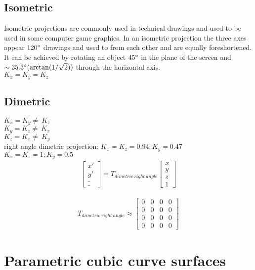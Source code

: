 \documentclass{article}
\begin{document}
\clearpage
\subsection{Isometric}
Isometric projections are commonly used in technical drawings and used to be used in some computer game graphics.
In an isometric projection the three axes appear $120\degree$ drawings and used to from each other and are equally foreshortened.
It can be achieved by rotating an object $45 \degree$ in the plane of the screen and $\sim 35.3 \degree (\arctan (1 / \sqrt 2))$ through the horizontal axis.
\\$K_x = K_y = K_z$
\subsection{Dimetric}
$K_x = K_y \neq~K_z$
\\$K_y = K_z \neq~K_x$
\\$K_z = K_x \neq~K_y$
\\right angle dimetric projection: $K_x = K_z = 0.94; K_y = 0.47$
\\$K_x = K_z = 1; K_y = 0.5$
\\
\begin{gather}
	\begin{bmatrix}
		x'\\
		y'\\
		\_\\
		\_
	\end{bmatrix}
	= T_{dimetric~right~angle}
	\begin{bmatrix}
		x\\
		y\\
		z\\
		1
	\end{bmatrix}
\end{gather}
  
\begin{gather}
	T_{dimetric~right~angle}
	\approx 
	\begin{bmatrix}
		0 & 0 & 0 & 0\\
		0 & 0 & 0 & 0\\
		0 & 0 & 0 & 0\\
		0 & 0 & 0 & 0
	\end{bmatrix}
\end{gather}
 
\clearpage

\section{Parametric cubic curve surfaces}
\end{document}

